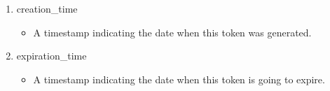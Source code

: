 \documentclass[letterpaper,10pt,english]{sphinxmanual}
\begin{document}
\begin{enumerate}
\begin{itemize}
\end{itemize}

\item {} 
creation\_time
\begin{itemize}
\item {} 
A timestamp indicating the date when this token was generated.

\end{itemize}

\item {} 
expiration\_time
\begin{itemize}
\item {} 
A timestamp indicating the date when this token is going to expire.

\end{itemize}

\end{enumerate}
\end{document}
